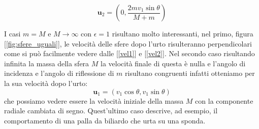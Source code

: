 \documentclass[a4paper,10pt,oneside]{article}
\begin{document}
\begin{equation}
 \mathbf{u}_2=\left(0,\frac{2mv_1\sin\theta}{M+m}\right)
\end{equation}

I casi $m=M$ e $M\to \infty$ con $\epsilon=1$ risultano molto interessanti, nel primo, figura [\ref{fig:sfere_uguali}], le velocità delle sfere dopo l'urto risulteranno perpendicolari come si può facilmente vedere dalle [\ref{vel1}] e [\ref{vel2}]. Nel secondo caso risultando infinita la massa della sfera $M$ la velocità finale di questa è nulla e l'angolo di incidenza e l'angolo di riflessione di $m$ risultano congruenti infatti otteniamo per la sua velocità dopo l'urto:
\begin{equation}
 \mathbf{u}_1=\left(v_1\cos\theta,v_1\sin\theta\right)
\end{equation}
che possiamo vedere essere la velocità iniziale della massa $M$ con la componente radiale cambiata di segno. Quest'ultimo caso descrive, ad esempio, il comportamento di una palla da biliardo che urta su una sponda.
\end{document}
